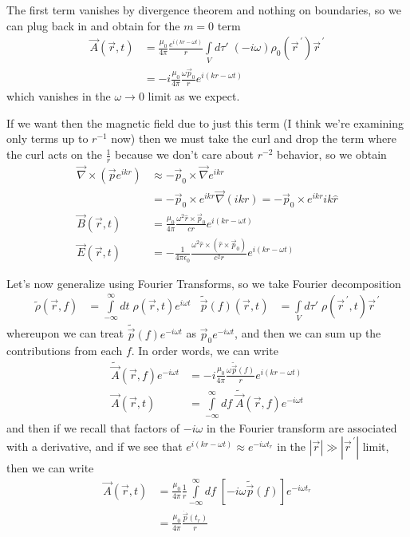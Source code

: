 \documentclass[10pt]{report}
\newcommand{\pvec}[1]{\vec{#1}^{\,\prime}}
\newcommand{\abs}[1]{\left|#1\right|}
\begin{document}
The first term vanishes by divergence theorem and nothing on boundaries, so we can plug back in and obtain for the $m=0$ term
\begin{align}
    \vec{A}(\vec{r},t) &= \frac{\mu_0}{4\pi}\frac{e^{i(kr - \omega t)}}{r} \int\limits_{V}^{}d\tau'\;\left( -i\omega \right)\rho_0(\pvec{r})\pvec{r}\\
    &= -i\frac{\mu_0}{4\pi}\frac{\omega \vec{p}_0}{r}e^{i\left( kr - \omega t \right)}
\end{align}
which vanishes in the $\omega \to 0$ limit as we expect. 

If we want then the magnetic field due to just this term (I think we're examining only terms up to $r^{-1}$ now) then we must take the curl and drop the term where the curl acts on the $\frac{1}{r}$ because we don't care about $r^{-2}$ behavior, so we obtain
\begin{align}
    \vec{\nabla} \times \left( \vec{p}e^{ikr} \right) &\approx -\vec{p}_0 \times \vec{\nabla} e^{ikr}\\
    &= -\vec{p}_0 \times e^{ikr}\vec{\nabla}(ikr) = -\vec{p}_0 \times e^{ikr}ik\hat{r}\\
    \vec{B}(\vec{r},t) &= \frac{\mu_0}{4\pi}\frac{\omega^2 \hat{r} \times \vec{p}_0}{cr} e^{i(kr - \omega t)}\\
    \vec{E}(\vec{r},t) &= -\frac{1}{4\pi\epsilon_0} \frac{\omega^2 \hat{r} \times \left( \hat{r} \times \vec{p}_0 \right)}{c^2r}e^{i(kr - \omega t)}
\end{align}

Let's now generalize using Fourier Transforms, so we take Fourier decomposition
\begin{align}
    \tilde{\rho}(\vec{r},f) &= \int\limits_{-\infty}^{\infty}dt\;\rho(\vec{r},t) e^{i\omega t} & \tilde{\vec{p}}(f)\left( \vec{r},t \right) &= \int\limits_{V}^{}d\tau'\;\rho(\pvec{r},t) \pvec{r}
\end{align}
whereupon we can treat $\tilde{\vec{p}}(f)e^{-i\omega t}$ as $\vec{p}_0 e^{-i \omega t}$, and then we can sum up the contributions from each $f$. In order words, we can write
\begin{align}
    \tilde{\vec{A}}(\vec{r},f) e^{-i \omega t} &= -i \frac{\mu_0}{4\pi}\frac{\omega \tilde{\vec{p}}(f)}{r}e^{i(kr - \omega t)}\\
    \vec{A}(\vec{r},t) &= \int\limits_{-\infty}^{\infty}df\;\tilde{\vec{A}}(\vec{r},f) e^{-i \omega t}
\end{align}
and then if we recall that factors of $-i\omega$ in the Fourier transform are associated with a derivative, and if we see that $e^{i(kr - \omega t)} \approx e^{-i \omega t_r}$ in the $\abs{\vec{r}}\gg \abs{\pvec{r}}$ limit, then we can write
\begin{align}
    \vec{A}(\vec{r},t) &= \frac{\mu_0}{4\pi}\frac{1}{r}\int\limits_{-\infty}^{\infty}df\;\left[ -i \omega \tilde{\vec{p}}(f) \right]e^{-i \omega t_r}\\
    &= \frac{\mu_0}{4\pi}\frac{\dot{\vec{p}}(t_r)}{r}
\end{align}
\end{document}
